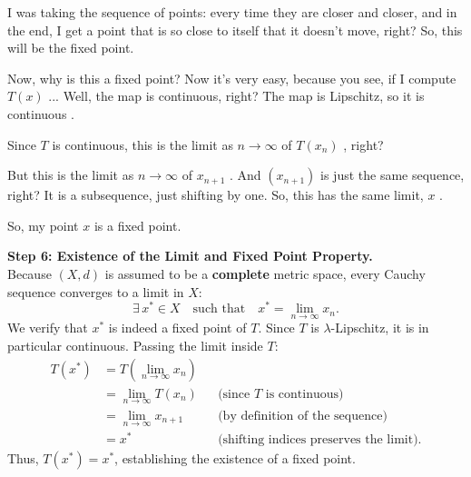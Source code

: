 \begin{proofWrapper}
\begin{speech}[00:35:47 - 00:36:41]
 I was taking the sequence of points: every time they are closer and closer, and in the end, I get a point that is so close to itself that it doesn't move, right? So, this will be the fixed point.
\end{speech}

\begin{speech}[00:36:41 - 00:37:50]
Now, why is this a fixed point? Now it's very easy, because you see, if I compute $T(x)$ ... Well, the map is continuous, right? The map is Lipschitz, so it is continuous .

Since $T$ is continuous, this is the limit as $n \to \infty$ of $T(x_n)$ , right?

But this is the limit as $n \to \infty$ of $x_{n+1}$ . And $(x_{n+1})$ is just the same sequence, right? It is a subsequence, just shifting by one. So, this has the same limit, $x$ .

So, my point $x$ is a fixed point. 
\end{speech}

\begin{content}
\textbf{Step 6: Existence of the Limit and Fixed Point Property.} \\
Because $(X, d)$ is assumed to be a \textbf{complete} metric space, every Cauchy sequence converges to a limit in $X$:
\begin{equation}\label{eq:limit-definition}
\exists \, x^* \in X \quad \text{such that} \quad x^* = \lim_{n \to \infty} x_n.
\end{equation}
We verify that $x^*$ is indeed a fixed point of $T$. Since $T$ is $\lambda$-Lipschitz, it is in particular continuous. Passing the limit inside $T$:
\begin{align}
T(x^*) &= T\left(\lim_{n \to \infty} x_n\right) \nonumber \\
&= \lim_{n \to \infty} T(x_n) && \text{(since $T$ is continuous)} \nonumber \\
&= \lim_{n \to \infty} x_{n+1} && \text{(by definition of the sequence)} \nonumber \\
&= x^* && \text{(shifting indices preserves the limit)}. \label{eq:fixed-point-verification}
\end{align}
Thus, $T(x^*) = x^*$, establishing the existence of a fixed point.
\end{content}


\end{proofWrapper}
